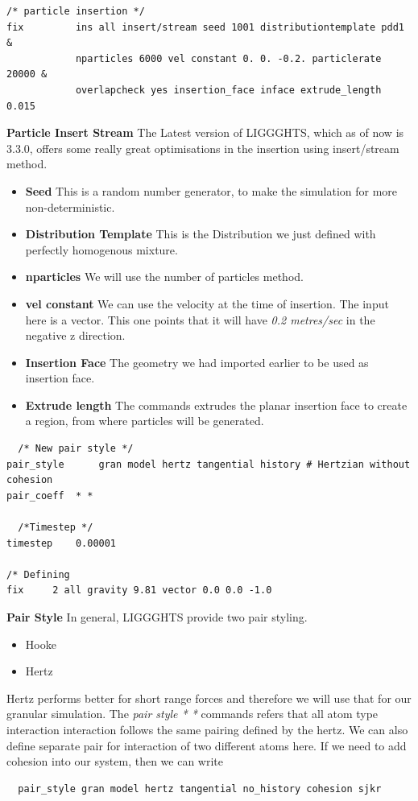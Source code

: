 \documentclass{tufte-book} %
\begin{document}
\begin{verbatim}
/* particle insertion */
fix         ins all insert/stream seed 1001 distributiontemplate pdd1 &
            nparticles 6000 vel constant 0. 0. -0.2. particlerate 20000 &
            overlapcheck yes insertion_face inface extrude_length 0.015                
\end{verbatim}
\textbf{Particle Insert Stream} The Latest version of LIGGGHTS, which as of now is 3.3.0, offers some really great optimisations in the insertion using insert/stream method.
\begin{itemize}
\item \textbf{Seed} This is a random number generator, to make the simulation for more non-deterministic.
\item \textbf{Distribution Template} This is the Distribution we just defined with perfectly homogenous mixture.
\item \textbf{nparticles} We will use the number of particles method. 
\item \textbf{vel constant} We can use the velocity at the time of insertion. The input here is a vector. This one points that it will have \textit{0.2 metres/sec} in the negative z direction. 
\item \textbf{Insertion Face} The geometry we had imported earlier to be used as insertion face. 
\item \textbf{Extrude length} The commands extrudes the planar insertion face to create a region, from where particles will be generated. 
\end{itemize}

\begin{verbatim}
  /* New pair style */
pair_style      gran model hertz tangential history # Hertzian without cohesion
pair_coeff	* *

  /*Timestep */
timestep	0.00001

/* Defining 
fix		2 all gravity 9.81 vector 0.0 0.0 -1.0

\end{verbatim}

\textbf{Pair Style}
In general, LIGGGHTS provide two pair styling.
\begin{itemize}
\item Hooke
\item Hertz
\end{itemize}
Hertz performs better for short range forces and therefore we will use that for our granular simulation. 
The \textit{pair style * *} commands refers that all atom type interaction interaction follows the same pairing defined by the hertz. We can also define separate pair for interaction of two different atoms here. If we need to add cohesion into our system, then we can write
\begin{verbatim}
  pair_style gran model hertz tangential no_history cohesion sjkr 
\end{verbatim}
\end{document}
